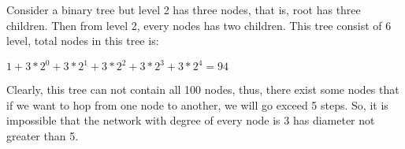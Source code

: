 \documentclass[12pt]{article}
\begin{document}
\begin{flushleft}
    \qquad
    Consider a binary tree but level 2 has three nodes, that is, root has three children.
    Then from level 2, every nodes has two children.
    This tree consist of 6 level, total nodes in this tree is:
    \begin{center}
        $ 1 + 3*2^0 + 3*2^1 + 3*2^2 + 3*2^3 + 3*2^4 = 94 $
    \end{center}
    \qquad
    Clearly, this tree can not contain all 100 nodes, thus,
    there exist some nodes that if we want to hop from one node to another,
    we will go exceed 5 steps.
    So, it is impossible that the network with degree of every node is 3 has diameter not greater than 5.
\end{flushleft}
\end{document}
